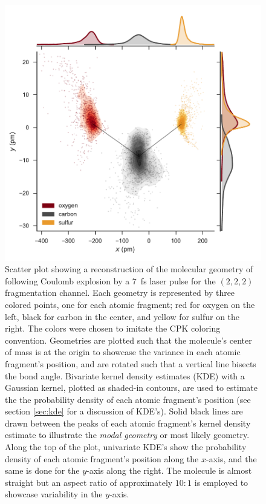 \begin{figure}
  \centering
  \includegraphics[width=\textwidth]{Plots/OCS2227fsMOGeometry}
  \caption[Scatter plot showing a reconstruction of the molecular geometry of  following Coulomb explosion by a \SI{7}{\fs} laser pulse for the $(2,2,2)$ fragmentation channel.]
  {Scatter plot showing a reconstruction of the molecular geometry of  following Coulomb explosion by a \SI{7}{\fs} laser pulse for the $(2,2,2)$ fragmentation channel. Each geometry is represented by three colored points, one for each atomic fragment; red for oxygen on the left, black for carbon in the center, and yellow for sulfur on the right. The colors were chosen to imitate the CPK coloring convention. Geometries are plotted such that the molecule's center of mass is at the origin to showcase the variance in each atomic fragment's position, and are rotated such that a vertical line bisects the  bond angle. Bivariate kernel density estimates (KDE) with a Gaussian kernel, plotted as shaded-in contours, are used to estimate the the probability density of each atomic fragment's position (see section \ref{sec:kde} for a discussion of KDE's). Solid black lines are drawn between the peaks of each atomic fragment's kernel density estimate to illustrate the \emph{modal geometry} or most likely geometry. Along the top of the plot, univariate KDE's show the probability density of each atomic fragment's position along the $x$-axis, and the same is done for the $y$-axis along the right. The molecule is almost straight but an aspect ratio of approximately $10:1$ is employed to showcase variability in the $y$-axis.}
  \label{fig:OCS2227fsMOGeometry}
\end{figure}

